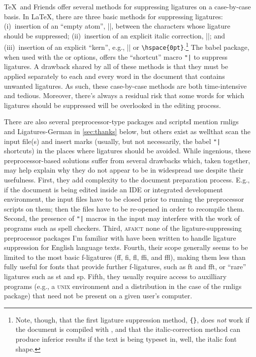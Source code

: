 \documentclass[11pt]{article}
\newcommand{\pkg}[1]{\textsf{#1}}
\newcommand{\opt}[1]{\uselig{\texttt{#1}}}
\begin{document}
\TeX\ and Friends offer several methods for suppressing ligatures on a case-by-case basis. In \LaTeX, there are three basic methods for suppressing ligatures: (i)~insertion of an \enquote{empty atom}, |{}|, between the characters whose ligature should be suppressed; (ii)~insertion of an explicit italic correction, |\/|; and (iii)~insertion of an explicit \enquote{kern}, e.g., |\kern0pt| or \Verb/\hspace{0pt}/.\footnote{Note, though, that the first ligature suppression method, \Verb/{}/, does \emph{not} work if the document is compiled with \LuaLaTeX, and that the italic-correction method can produce inferior results if the text is being typeset in, well, the italic font shape.} The \pkg{babel} package, when used with the \opt{ngerman} or \opt{german} options, offers the \enquote{shortcut} macro \Verb/"|/ to suppress ligatures. A drawback shared by all of these methods is that they must be applied separately to each and every word in the document that contains unwanted ligatures. As such, these case-by-case methods are both time-intensive and tedious. Moreover, there's always a residual risk that some words for which ligatures should be suppressed will be overlooked in the editing process. 

There are also several preprocessor-type packages and scripts\textemdash I mention \pkg{rmligs} and \pkg{Ligatures-German} in \cref{sec:thanks} below, but others exist as well\textemdash that scan the input file(s) and insert marks (usually, but not necessarily, the \pkg{babel} \Verb/"|/ shortcuts) in the places where ligatures should be avoided. While ingenious, these preprocessor-based solutions suffer from several drawbacks which, taken together, may help explain why they do not appear to be in widespread use despite their usefulness. First, they add complexity to the document preparation process. E.g., if the document is being edited inside an IDE or integrated development environment, the input files have to be closed prior to running the preprocessor scripts on them; then the files have to be re-opened in order to recompile them. Second, the presence of \Verb+"|+ macros in the input may interfere with the work of programs such as spell checkers. Third, \textsc{afaict} none of the ligature-suppressing preprocessor packages I'm familiar with have been written to handle ligature suppression for English language texts. Fourth, their scope generally seems to be limited to the most basic f-ligatures (ff, fi, fl, ffi, and ffl), making them less than fully useful for fonts that provide further f-ligatures, such as ft and fft, or \enquote{rare} ligatures such as st and sp. Fifth, they usually require access to auxilliary programs (e.g., a \textsc{unix} environment and a \opt{perl} distribution in the case of the \pkg{rmligs} package) that need not be present on a given user's computer. 
\end{document}
